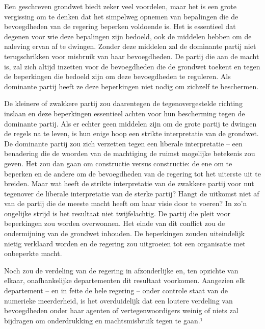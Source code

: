 \documentclass[
  a5paper,
  smalldemyvopaper,10pt,twoside,onecolumn,openright,extrafontsizes,hidelinks]{memoir}
\renewenvironment{quote}%
               {\list{}{\rightmargin=.6cm\leftmargin=.6cm}%
                \itshape \item[]}%
               {\endlist}
\begin{document}
\begin{quote}
Een geschreven grondwet biedt zeker veel voordelen, maar het is een
grote vergissing om te denken dat het simpelweg opnemen van bepalingen
die de bevoegdheden van de regering beperken voldoende is. Het is
essentieel dat degenen voor wie deze bepalingen zijn bedoeld, ook de
middelen hebben om de naleving ervan af te dwingen. Zonder deze middelen
zal de dominante partij niet terugschrikken voor misbruik van haar
bevoegdheden. De partij die aan de macht is, zal zich altijd inzetten
voor de bevoegdheden die de grondwet toekent en tegen de beperkingen die
bedoeld zijn om deze bevoegdheden te reguleren. Als dominante partij
heeft ze deze beperkingen niet nodig om zichzelf te beschermen.

De kleinere of zwakkere partij zou daarentegen de tegenovergestelde
richting inslaan en deze beperkingen essentieel achten voor hun
bescherming tegen de dominante partij. Als er echter geen middelen zijn
om de grote partij te dwingen de regels na te leven, is hun enige hoop
een strikte interpretatie van de grondwet. De dominante partij zou zich
verzetten tegen een liberale interpretatie -- een benadering die de
woorden van de machtiging de ruimst mogelijke betekenis zou geven. Het
zou dan gaan om constructie versus constructie: de ene om te beperken en
de andere om de bevoegdheden van de regering tot het uiterste uit te
breiden. Maar wat heeft de strikte interpretatie van de zwakkere partij
voor nut tegenover de liberale interpretatie van de sterke partij? Hangt
de uitkomst niet af van de partij die de meeste macht heeft om haar
visie door te voeren? In zo'n ongelijke strijd is het resultaat niet
twijfelachtig. De partij die pleit voor beperkingen zou worden
overwonnen. Het einde van dit conflict zou de ondermijning van de
grondwet inhouden. De beperkingen zouden uiteindelijk nietig verklaard
worden en de regering zou uitgroeien tot een organisatie met onbeperkte
macht.

Noch zou de verdeling van de regering in afzonderlijke en, ten opzichte
van elkaar, onafhankelijke departementen dit resultaat voorkomen.
Aangezien elk departement -- en in feite de hele regering -- onder
controle staat van de numerieke meerderheid, is het overduidelijk dat
een loutere verdeling van bevoegdheden onder haar agenten of
vertegenwoordigers weinig of niets zal bijdragen om onderdrukking en
machtsmisbruik tegen te gaan.¹
\end{quote}
\end{document}
